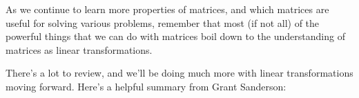 \documentclass{ximera}
\begin{document}
\begin{remark}

    As we continue to learn more properties of matrices, and which matrices are useful for solving various problems, remember that most (if not all) of the powerful things that we can do with matrices boil down to the understanding of matrices as linear transformations.

\end{remark}

There's a lot to review, and we'll be doing much more with linear transformations moving forward. Here's a helpful summary from Grant Sanderson:

\end{document}
